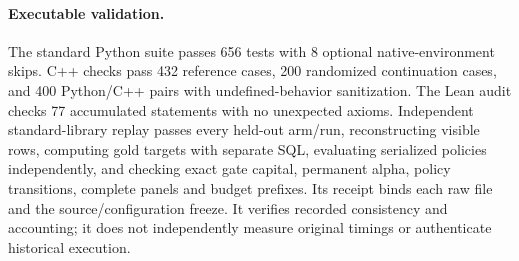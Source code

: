 \paragraph{Executable validation.} The standard Python suite passes 656 tests with 8 optional native-environment skips. C++ checks pass 432 reference cases, 200 randomized continuation cases, and 400 Python/C++ pairs with undefined-behavior sanitization. The Lean audit checks 77 accumulated statements with no unexpected axioms. Independent standard-library replay passes every held-out arm/run, reconstructing visible rows, computing gold targets with separate SQL, evaluating serialized policies independently, and checking exact gate capital, permanent alpha, policy transitions, complete panels and budget prefixes. Its receipt binds each raw file and the source/configuration freeze. It verifies recorded consistency and accounting; it does not independently measure original timings or authenticate historical execution.
